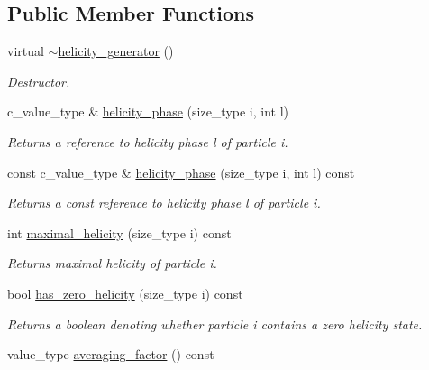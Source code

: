 \subsection*{Public Member Functions}
\begin{DoxyCompactItemize}
\item 
\hypertarget{a00272_a10babb70a60f6671b35bdb45227aefad}{}virtual \hyperlink{a00272_a10babb70a60f6671b35bdb45227aefad}{$\sim$helicity\+\_\+generator} ()\label{a00272_a10babb70a60f6671b35bdb45227aefad}

\begin{DoxyCompactList}\small\item\em Destructor. \end{DoxyCompactList}\item 
\hypertarget{a00272_a91e8d2238fd375fea57d6c344a4fcafc}{}c\+\_\+value\+\_\+type \& \hyperlink{a00272_a91e8d2238fd375fea57d6c344a4fcafc}{helicity\+\_\+phase} (size\+\_\+type i, int l)\label{a00272_a91e8d2238fd375fea57d6c344a4fcafc}

\begin{DoxyCompactList}\small\item\em Returns a reference to helicity phase l of particle i. \end{DoxyCompactList}\item 
\hypertarget{a00272_a30fcb04c2016208a6e792829c8d5a364}{}const c\+\_\+value\+\_\+type \& \hyperlink{a00272_a30fcb04c2016208a6e792829c8d5a364}{helicity\+\_\+phase} (size\+\_\+type i, int l) const \label{a00272_a30fcb04c2016208a6e792829c8d5a364}

\begin{DoxyCompactList}\small\item\em Returns a const reference to helicity phase l of particle i. \end{DoxyCompactList}\item 
\hypertarget{a00272_a4098dd33ce8705cb67aaa16aa03fb657}{}int \hyperlink{a00272_a4098dd33ce8705cb67aaa16aa03fb657}{maximal\+\_\+helicity} (size\+\_\+type i) const \label{a00272_a4098dd33ce8705cb67aaa16aa03fb657}

\begin{DoxyCompactList}\small\item\em Returns maximal helicity of particle i. \end{DoxyCompactList}\item 
bool \hyperlink{a00272_a23ecd31466020f4c1afa401ac5778e60}{has\+\_\+zero\+\_\+helicity} (size\+\_\+type i) const 
\begin{DoxyCompactList}\small\item\em Returns a boolean denoting whether particle i contains a zero helicity state. \end{DoxyCompactList}\item 
\hypertarget{a00272_ac1f1ede008b6bc97ae556204636c3506}{}value\+\_\+type \hyperlink{a00272_ac1f1ede008b6bc97ae556204636c3506}{averaging\+\_\+factor} () const \label{a00272_ac1f1ede008b6bc97ae556204636c3506}


\end{DoxyCompactItemize}
